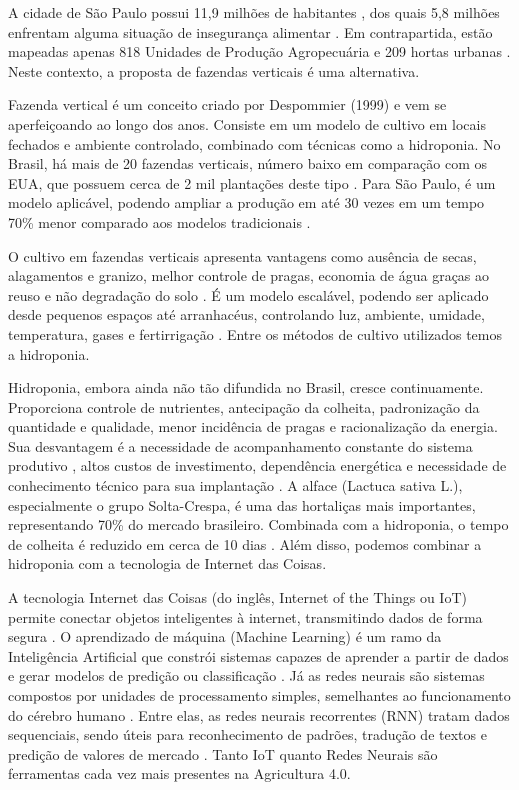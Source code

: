 A cidade de São Paulo possui 11,9 milhões de habitantes \cite{agenciabrasil2025}, dos quais 5,8 milhões enfrentam alguma situação de insegurança alimentar \cite{radioagencia2024}. Em contrapartida, estão mapeadas apenas 818 Unidades de Produção Agropecuária e 209 hortas urbanas \cite{sampa2025}. Neste contexto, a proposta de fazendas verticais é uma alternativa.

Fazenda vertical é um conceito criado por Despommier (1999) e vem se aperfeiçoando ao longo dos anos. Consiste em um modelo de cultivo em locais fechados e ambiente controlado, combinado com técnicas como a hidroponia. No Brasil, há mais de 20 fazendas verticais, número baixo em comparação com os EUA, que possuem cerca de 2 mil plantações deste tipo \cite{costa2025}. Para São Paulo, é um modelo aplicável, podendo ampliar a produção em até 30 vezes em um tempo 70\% menor comparado aos modelos tradicionais \cite{gundim2022}.

O cultivo em fazendas verticais apresenta vantagens como ausência de secas, alagamentos e granizo, melhor controle de pragas, economia de água graças ao reuso e não degradação do solo \cite{ingram2023}. É um modelo escalável, podendo ser aplicado desde pequenos espaços até arranhacéus, controlando luz, ambiente, umidade, temperatura, gases e fertirrigação \cite{lucena2021}. Entre os métodos de cultivo utilizados temos a hidroponia.

Hidroponia, embora ainda não tão difundida no Brasil, cresce continuamente. Proporciona controle de nutrientes, antecipação da colheita, padronização da quantidade e qualidade, menor incidência de pragas e racionalização da energia. Sua desvantagem é a necessidade de acompanhamento constante do sistema produtivo \cite{luz2006}, altos custos de investimento, dependência energética e necessidade de conhecimento técnico para sua implantação \cite{alves2021}. A alface (Lactuca sativa L.), especialmente o grupo Solta-Crespa, é uma das hortaliças mais importantes, representando 70\% do mercado brasileiro. Combinada com a hidroponia, o tempo de colheita é reduzido em cerca de 10 dias \cite{luz2006}. Além disso, podemos combinar a hidroponia com a tecnologia de Internet das Coisas.

A tecnologia Internet das Coisas (do inglês, Internet of the Things ou IoT) permite conectar objetos inteligentes à internet, transmitindo dados de forma segura \cite{carnaz2016}. O aprendizado de máquina (Machine Learning) é um ramo da Inteligência Artificial que constrói sistemas capazes de aprender a partir de dados e gerar modelos de predição ou classificação \cite{paixao2022}. Já as redes neurais são sistemas compostos por unidades de processamento simples, semelhantes ao funcionamento do cérebro humano \cite{haykin2001}. Entre elas, as redes neurais recorrentes (RNN) tratam dados sequenciais, sendo úteis para reconhecimento de padrões, tradução de textos e predição de valores de mercado \cite{baronte2022}. Tanto IoT quanto Redes Neurais são ferramentas cada vez mais presentes na Agricultura 4.0.


